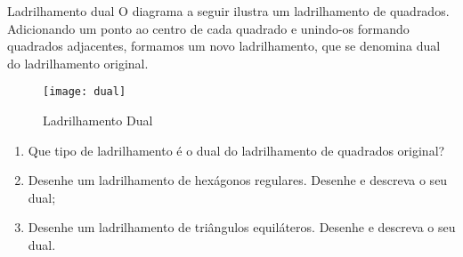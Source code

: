 \begin{task}{Ladrilhamento dual}
O diagrama a seguir ilustra um ladrilhamento de quadrados. Adicionando um ponto ao centro de cada quadrado e unindo-os formando quadrados adjacentes, formamos um novo ladrilhamento, que se denomina dual do ladrilhamento original.

	\begin{figure}[H]
	\centering
	\texttt{[image: dual]}
	\caption{Ladrilhamento Dual}
	\end{figure}

	\begin{enumerate}
		\item Que tipo de ladrilhamento é o dual do ladrilhamento de quadrados original?
		\item Desenhe um ladrilhamento de hexágonos regulares. Desenhe e descreva o seu dual;
		\item Desenhe um ladrilhamento de triângulos equiláteros. Desenhe e descreva o seu dual.
	\end{enumerate}

\end{task}




